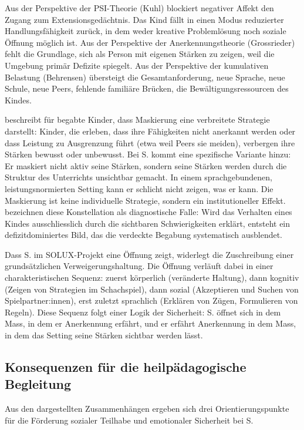 \documentclass[ngerman, a4paper]{article}
\begin{document}
Aus der Perspektive der PSI-Theorie (Kuhl) blockiert negativer Affekt den Zugang zum
Extensionsgedächtnis. Das Kind fällt in einen Modus reduzierter Handlungsfähigkeit
zurück, in dem weder kreative Problemlösung noch soziale Öffnung möglich ist. Aus der
Perspektive der Anerkennungstheorie (Grossrieder) fehlt die Grundlage, sich als Person
mit eigenen Stärken zu zeigen, weil die Umgebung primär Defizite spiegelt. Aus der
Perspektive der kumulativen Belastung (Behrensen) übersteigt die Gesamtanforderung,
neue Sprache, neue Schule, neue Peers, fehlende familiäre Brücken, die
Bewältigungsressourcen des Kindes.

\textcite{lehwald2017motivation} beschreibt für begabte Kinder, dass Maskierung eine verbreitete Strategie
darstellt: Kinder, die erleben, dass ihre Fähigkeiten nicht anerkannt werden oder dass
Leistung zu Ausgrenzung führt (etwa weil Peers sie meiden), verbergen ihre Stärken
bewusst oder unbewusst. Bei S. kommt eine spezifische Variante hinzu: Er maskiert nicht
aktiv seine Stärken, sondern seine Stärken werden durch die Struktur des Unterrichts
unsichtbar gemacht. In einem sprachgebundenen, leistungsnormierten Setting kann er
schlicht nicht zeigen, was er kann. Die Maskierung ist keine individuelle Strategie,
sondern ein institutioneller Effekt.
\textcite{webb2020doppeldiagnosen} bezeichnen diese Konstellation als
diagnostische Falle: Wird das Verhalten eines Kindes ausschliesslich durch
die sichtbaren Schwierigkeiten erklärt, entsteht ein defizitdominiertes Bild,
das die verdeckte Begabung systematisch ausblendet.

Dass S. im SOLUX-Projekt eine Öffnung zeigt, widerlegt die Zuschreibung einer
grundsätzlichen Verweigerungshaltung. Die Öffnung verläuft dabei in einer
charakteristischen Sequenz: zuerst körperlich (veränderte Haltung), dann kognitiv
(Zeigen von Strategien im Schachspiel), dann sozial (Akzeptieren und Suchen von
Spielpartner:innen), erst zuletzt sprachlich (Erklären von Zügen, Formulieren von
Regeln). Diese Sequenz folgt einer Logik der Sicherheit: S. öffnet sich
in dem Mass, in dem er Anerkennung erfährt, und er erfährt Anerkennung in dem Mass,
in dem das Setting seine Stärken sichtbar werden lässt.

\subsection{Konsequenzen für die heilpädagogische Begleitung}

Aus den dargestellten Zusammenhängen ergeben sich drei Orientierungspunkte für die
Förderung sozialer Teilhabe und emotionaler Sicherheit bei S.
\end{document}
